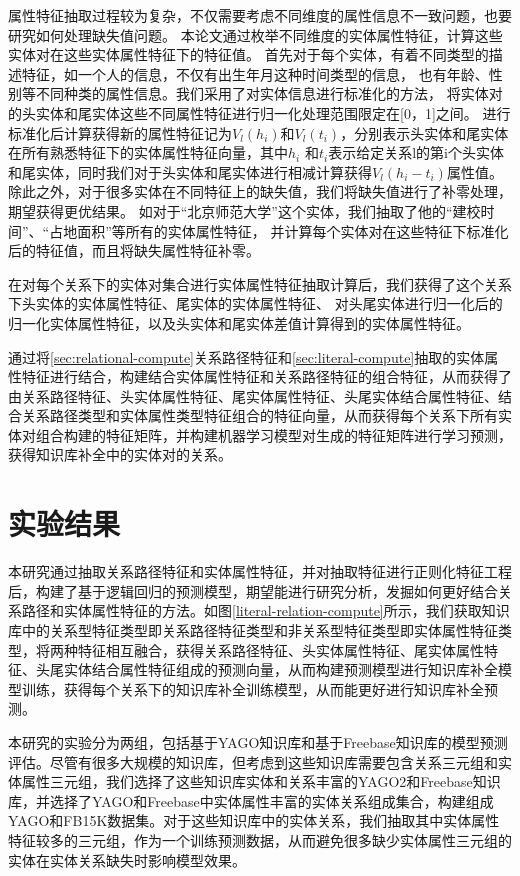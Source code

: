 属性特征抽取过程较为复杂，不仅需要考虑不同维度的属性信息不一致问题，也要研究如何处理缺失值问题。
本论文通过枚举不同维度的实体属性特征，计算这些实体对在这些实体属性特征下的特征值。
首先对于每个实体，有着不同类型的描述特征，如一个人的信息，不仅有出生年月这种时间类型的信息，
也有年龄、性别等不同种类的属性信息。我们采用了对实体信息进行标准化的方法，
将实体对的头实体和尾实体这些不同属性特征进行归一化处理范围限定在[0，1]之间。
进行标准化后计算获得新的属性特征记为$V_l(h_i)$和$V_l (t_i)$，分别表示头实体和尾实体在所有熟悉特征下的实体属性特征向量，其中$h_i$ 和$t_i$表示给定关系l的第i个头实体和尾实体，同时我们对于头实体和尾实体进行相减计算获得$V_l(h_i-t_i )$属性值。除此之外，对于很多实体在不同特征上的缺失值，我们将缺失值进行了补零处理，期望获得更优结果。
如对于“北京师范大学”这个实体，我们抽取了他的“建校时间”、“占地面积”等所有的实体属性特征，
并计算每个实体对在这些特征下标准化后的特征值，而且将缺失属性特征补零。

在对每个关系下的实体对集合进行实体属性特征抽取计算后，我们获得了这个关系下头实体的实体属性特征、尾实体的实体属性特征、
对头尾实体进行归一化后的归一化实体属性特征，以及头实体和尾实体差值计算得到的实体属性特征。

通过将\ref{sec:relational-compute}关系路径特征和\ref{sec:literal-compute}抽取的实体属性特征进行结合，构建结合实体属性特征和关系路径特征的组合特征，从而获得了由关系路径特征、头实体属性特征、尾实体属性特征、头尾实体结合属性特征、结合关系路径类型和实体属性类型特征组合的特征向量，从而获得每个关系下所有实体对组合构建的特征矩阵，并构建机器学习模型对生成的特征矩阵进行学习预测，获得知识库补全中的实体对的关系。


\section{实验结果}

本研究通过抽取关系路径特征和实体属性特征，并对抽取特征进行正则化特征工程后，构建了基于逻辑回归的预测模型，期望能进行研究分析，发掘如何更好结合关系路径和实体属性特征的方法。如图\ref{literal-relation-compute}所示，我们获取知识库中的关系型特征类型即关系路径特征类型和非关系型特征类型即实体属性特征类型，将两种特征相互融合，获得关系路径特征、头实体属性特征、尾实体属性特征、头尾实体结合属性特征组成的预测向量，从而构建预测模型进行知识库补全模型训练，获得每个关系下的知识库补全训练模型，从而能更好进行知识库补全预测。

本研究的实验分为两组，包括基于YAGO知识库和基于Freebase知识库的模型预测评估。尽管有很多大规模的知识库，但考虑到这些知识库需要包含关系三元组和实体属性三元组，我们选择了这些知识库实体和关系丰富的YAGO2和Freebase知识库，并选择了YAGO和Freebase中实体属性丰富的实体关系组成集合，构建组成YAGO和FB15K数据集。对于这些知识库中的实体关系，我们抽取其中实体属性特征较多的三元组，作为一个训练预测数据，从而避免很多缺少实体属性三元组的实体在实体关系缺失时影响模型效果。

